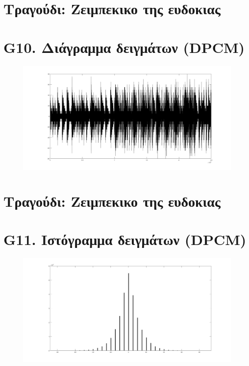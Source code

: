 \documentclass{article}
\begin{document}
\section*{Τραγούδι: Ζειμπεκικο της ευδοκιας}
\section*{G10. Διάγραμμα δειγμάτων (DPCM) }
\begin{figure}[h!]
 \begin{center}
 \advance\leftskip-6cm
  \includegraphics[width=230mm,scale=0.7]{g10s2.jpg}
\end{center}
\end{figure}
\newpage
\section*{Τραγούδι:  Ζειμπεκικο της ευδοκιας}
\section*{G11. Ιστόγραμμα δειγμάτων (DPCM) }
\begin{figure}[h!]
 \begin{center}
 \advance\leftskip-6cm
  \includegraphics[width=230mm,scale=0.7]{g11s2.jpg}
\end{center}
\end{figure}
\newpage
\end{document}
